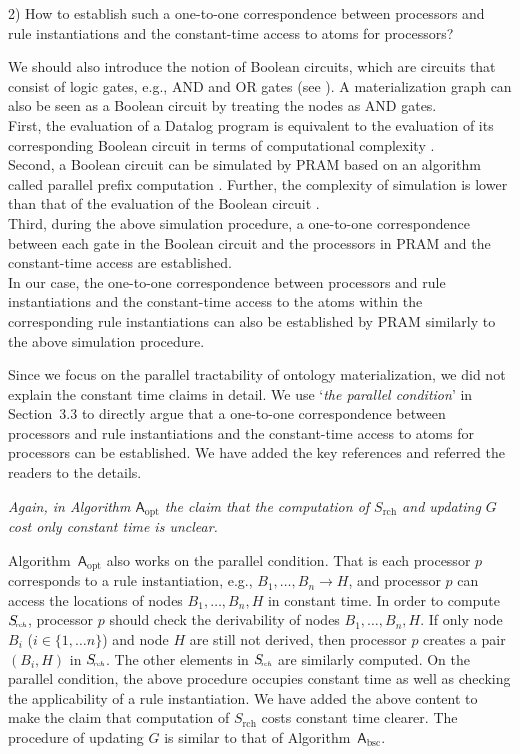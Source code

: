 \documentclass{article}
\let\quoteOld\quote
\let\endquoteOld\endquote
\renewenvironment{quote}{\quoteOld\itshape}{\endquoteOld}
\begin{document}
2) How to establish such a one-to-one correspondence between processors
and rule instantiations and the constant-time access to atoms for processors?

We should also introduce the notion of Boolean circuits, which are
circuits that consist of logic gates, e.g., AND and OR gates (see
\cite[Section~2.3]{Raymond95}).  A materialization graph can also be
seen as a Boolean circuit by treating the nodes as AND gates.\\
%
First, the evaluation of a Datalog program is equivalent to the evaluation
of its corresponding Boolean circuit in terms of computational
complexity \cite{DMRT14a}. \\
%
Second, a Boolean circuit can be simulated by PRAM based on an
algorithm called parallel prefix computation \cite{LaFi80a}.  Further,
the complexity of simulation is lower than that of the evaluation of
the Boolean circuit \cite[Lemma~2.4.1]{Raymond95}.\\
%
Third, during the above simulation procedure, a one-to-one
correspondence between each gate in the Boolean circuit and the
processors in PRAM and the constant-time access are established.\\
%
In our case, the one-to-one correspondence between processors and rule
instantiations and the constant-time access to the atoms within the corresponding
rule instantiations can also be
established by PRAM similarly to the above simulation procedure.

Since we focus on the parallel tractability of ontology materialization,
we did not explain the constant time claims in detail.
We use `\emph{the parallel condition}' in Section~3.3 to directly
argue that a one-to-one correspondence between processors
and rule instantiations and the constant-time access to atoms for processors
can be established. We have added the key references and referred the readers
to the details.

\begin{quote}
  Again, in Algorithm $\mathsf{A}_\text{opt}$ the claim that the
  computation of $S_\text{rch}$ and updating $G$ cost only constant
  time is unclear.
\end{quote}

Algorithm~$\mathsf{A}_{\text{opt}}$ also works on the parallel condition.
That is each processor $p$ corresponds to a rule instantiation, e.g., $B_1,\ldots,B_n\rightarrow H$,
and processor $p$ can access the locations of nodes $B_1,\ldots,B_n, H$ in constant time.
In order to compute $S_{\!\textit{\tiny rch}}$, processor $p$ should check the derivability
of nodes $B_1,\ldots,B_n, H$. If only node $B_i$ ($i\in\{1,\ldots n\}$) and node $H$
are still not derived, then processor $p$ creates a pair $(B_i, H)$ in $S_{\!\textit{\tiny rch}}$.
The other elements in $S_{\!\textit{\tiny rch}}$ are similarly computed.
On the parallel condition, the above procedure occupies constant time as well as checking
the applicability of a rule instantiation.
We have added the above content to make the claim that computation of $S_\text{rch}$ costs
constant time clearer.
The procedure of updating $G$ is similar to that of Algorithm~$\mathsf{A}_{\text{bsc}}$.



\end{document}

